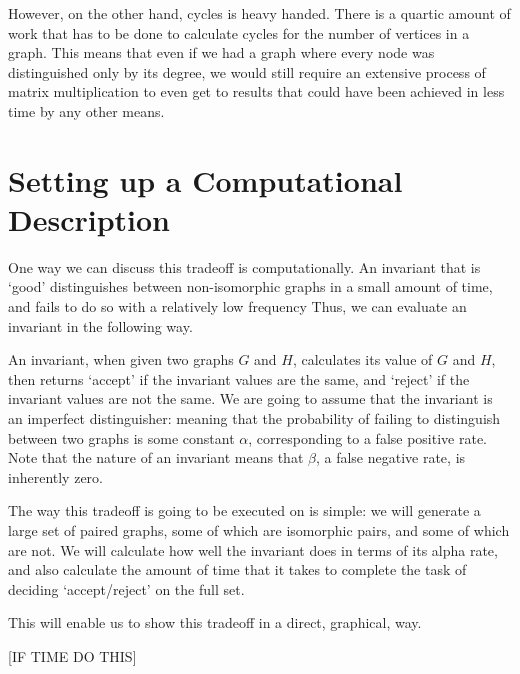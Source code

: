 However, on the other hand, cycles is heavy handed. There is a quartic amount of work that has to be done to calculate cycles for the number of vertices in a graph.
This means that even if we had a graph where every node was distinguished only by its degree, we would still require an extensive process of matrix multiplication to even get to results that could have been achieved in less time by any other means.

\section{Setting up a Computational Description}

One way we can discuss this tradeoff is computationally.
An invariant that is `good' distinguishes between non-isomorphic graphs in a small amount of time, and fails to do so with a relatively low frequency
Thus, we can evaluate an invariant in the following way.

An invariant, when given two graphs $G$ and $H$, calculates its value of $G$ and $H$, then returns `accept' if the invariant values are the same, and `reject' if the invariant values are not the same.
We are going to assume that the invariant is an imperfect distinguisher: meaning that the probability of failing to distinguish between two graphs is some constant $\alpha$, corresponding to a false positive rate.
Note that the nature of an invariant means that $\beta$, a false negative rate, is inherently zero.

The way this tradeoff is going to be executed on is simple: we will generate a large set of paired graphs, some of which are isomorphic pairs, and some of which are not.
We will calculate how well the invariant does in terms of its alpha rate, and also calculate the amount of time that it takes to complete the task of deciding `accept/reject' on the full set.

This will enable us to show this tradeoff in a direct, graphical, way.

[IF TIME DO THIS]

